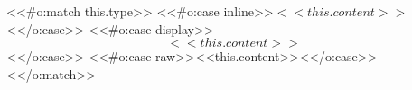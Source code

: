 <<#o:match this.type>>
  <<#o:case inline>>\(<<this.content>>\)<</o:case>>
  <<#o:case display>>\[<<this.content>>\]<</o:case>>
  <<#o:case raw>><<this.content>><</o:case>>
<</o:match>>
